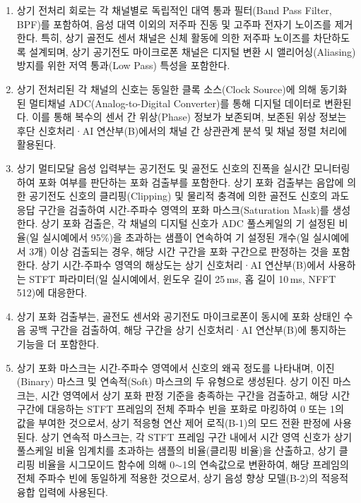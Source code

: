 \documentclass{article}
\begin{document}
\begin{enumerate}[label = \textbf{(A.2.\arabic*)}]

    \item 상기 전처리 회로는 각 채널별로 독립적인 대역 통과 필터(Band Pass Filter, BPF)를 포함하여, 음성 대역 이외의 저주파 진동 및 고주파 전자기 노이즈를 제거한다. 
    특히, 상기 골전도 센서 채널은 신체 활동에 의한 저주파 노이즈를 차단하도록 설계되며, 상기 공기전도 마이크로폰 채널은 디지털 변환 시 앨리어싱(Aliasing) 방지를 위한 저역 통과(Low Pass) 특성을 포함한다.

    \item 상기 전처리된 각 채널의 신호는 동일한 클록 소스(Clock Source)에 의해 동기화된 멀티채널 ADC(Analog-to-Digital Converter)를 통해 디지털 데이터로 변환된다. 
    이를 통해 복수의 센서 간 위상(Phase) 정보가 보존되며, 보존된 위상 정보는 후단 신호처리·AI 연산부(B)에서의 채널 간 상관관계 분석 및 채널 정렬 처리에 활용된다.

    \item 상기 멀티모달 음성 입력부는 공기전도 및 골전도 신호의 진폭을 실시간 모니터링하여 포화 여부를 판단하는 포화 검출부를 포함한다. 
    상기 포화 검출부는 음압에 의한 공기전도 신호의 클리핑(Clipping) 및 물리적 충격에 의한 골전도 신호의 과도 응답 구간을 검출하여 시간-주파수 영역의 포화 마스크(Saturation Mask)를 생성한다. 상기 포화 검출은, 각 채널의 디지털 신호가 ADC 풀스케일의 기 설정된 비율(일 실시예에서 95\%)을 초과하는 샘플이 연속하여 기 설정된 개수(일 실시예에서 3개) 이상 검출되는 경우, 해당 시간 구간을 포화 구간으로 판정하는 것을 포함한다. 상기 시간-주파수 영역의 해상도는 상기 신호처리·AI 연산부(B)에서 사용하는 STFT 파라미터(일 실시예에서, 윈도우 길이 25\,ms, 홉 길이 10\,ms, NFFT 512)에 대응한다.

    \item 상기 포화 검출부는, 골전도 센서와 공기전도 마이크로폰이 동시에 포화 상태인 수음 공백 구간을 검출하여, 해당 구간을 상기 신호처리·AI 연산부(B)에 통지하는 기능을 더 포함한다.

    \item 상기 포화 마스크는 시간-주파수 영역에서 신호의 왜곡 정도를 나타내며, 이진(Binary) 마스크 및 연속적(Soft) 마스크의 두 유형으로 생성된다. 상기 이진 마스크는, 시간 영역에서 상기 포화 판정 기준을 충족하는 구간을 검출하고, 해당 시간 구간에 대응하는 STFT 프레임의 전체 주파수 빈을 포화로 마킹하여 0 또는 1의 값을 부여한 것으로서, 상기 적응형 연산 제어 로직(B-1)의 모드 전환 판정에 사용된다. 상기 연속적 마스크는, 각 STFT 프레임 구간 내에서 시간 영역 신호가 상기 풀스케일 비율 임계치를 초과하는 샘플의 비율(클리핑 비율)을 산출하고, 상기 클리핑 비율을 시그모이드 함수에 의해 0$\sim$1의 연속값으로 변환하여, 해당 프레임의 전체 주파수 빈에 동일하게 적용한 것으로서, 상기 음성 향상 모델(B-2)의 적응적 융합 입력에 사용된다.

\end{enumerate}
\end{document}
